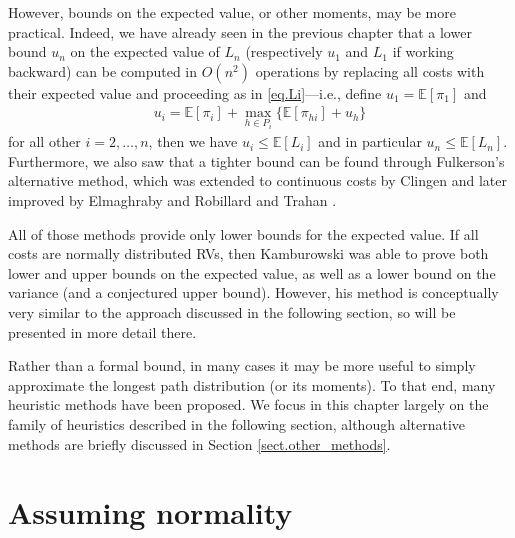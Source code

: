\documentclass[12pt]{article}
\def\E{\mathbb{E}}
\begin{document}
However, bounds on the expected value, or other moments, may be more practical. Indeed, we have already seen in the previous chapter that a lower bound $u_n$ on the expected value of $L_n$ (respectively $u_1$ and $L_1$ if working backward) can be computed in $O(n^2)$ operations by replacing all costs with their expected value and proceeding as in \eqref{eq.Li}---i.e., define $u_1 = \E[\pi_1]$ and
\begin{align}
  \label{eq.ui}
  u_i = \E[\pi_i] + \max_{h \in P_i}\{ \E[\pi_{hi}] + u_h\}
\end{align}
for all other $i = 2, \dots, n$, then we have $u_i \leq \E[L_i]$ and in particular $u_n \leq \E[L_n]$. Furthermore, we also saw that a tighter bound can be found through Fulkerson's \cite{ful62} alternative method, which was extended to continuous costs by Clingen \cite{cli64} and later improved by Elmaghraby \cite{elm67} and Robillard and Trahan \cite{rob76}.

All of those methods provide only lower bounds for the expected value. If all costs are normally distributed RVs, then Kamburowski \cite{kam85} was able to prove both lower and upper bounds on the expected value, as well as a lower bound on the variance (and a conjectured upper bound). However, his method is conceptually very similar to the approach discussed in the following section, so will be presented in more detail there.

Rather than a formal bound, in many cases it may be more useful to simply approximate the longest path distribution (or its moments). To that end, many heuristic methods have been proposed. We focus in this chapter largely on the family of heuristics described in the following section, although alternative methods are briefly discussed in Section \ref{sect.other_methods}.


\section{Assuming normality}
\label{sect.normality}
\end{document}
